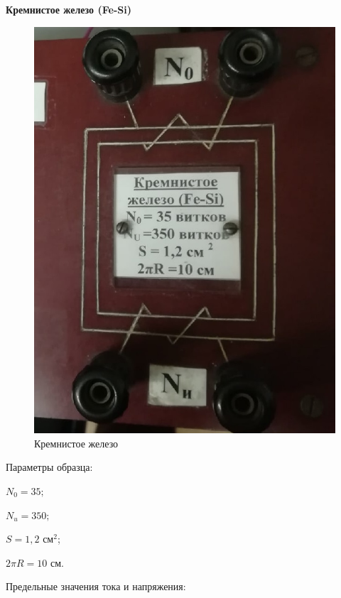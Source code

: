 \documentclass[a4paper,12pt]{article} %
\begin{document}
\newpage
\textbf{{\large Кремнистое железо (Fe-Si)}}
\begin{figure}[h!]
	\centering
	\includegraphics[scale=0.6]{Pictures/КРМЖЛЗ.jpg}
	\caption{Кремнистое железо}
\end{figure}

Параметры образца:

$N_0 = 35;$

$N_u = 350;$

$S = 1,2$ см$^2$;

$2\pi R = 10$ см.

\vspace{7mm}
Предельные значения тока и напряжения:
\end{document}

